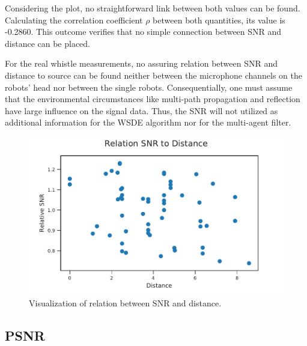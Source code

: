 Considering the plot, no straightforward link between both values can be found.
Calculating the correlation coefficient $\rho$ between both quantities,
its value is -0.2860.
This outcome verifies that no simple connection between \ac{SNR} and distance
can be placed.

For the real whistle measurements, no assuring relation between \ac{SNR}
and distance to source can be found neither between the microphone
channels on the robots' head nor between the single robots.
Consequentially, one must assume that the environmental circumstances
like multi-path propagation and reflection have large influence
on the signal data.
Thus, the \ac{SNR} will not utilized as additional information
for the \ac{WSDE} algorithm nor for the multi-agent filter.
\begin{figure}[h]
	\centering
	\includegraphics[]{figures/evaluation/snr_scatter}
	\caption{Visualization of relation between SNR and distance.}
	\label{fig:04_snrDistance}
\end{figure}

\subsection{PSNR}
\label{subsec:04_psnr}

